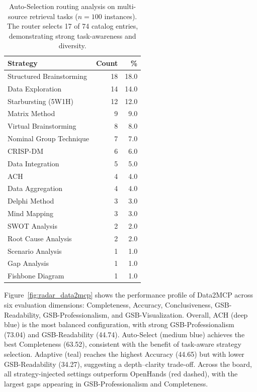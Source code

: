 \begin{table}[t]
  \caption{Auto-Selection routing analysis on multi-source retrieval tasks ($n=100$ instances). The router selects 17 of 74 catalog entries, demonstrating strong task-awareness and diversity.}
  \label{tab:routing_multisource}
  \centering
  \small
  \begin{tabular}{lrr}
    \toprule
    Strategy & Count & \% \\
    \midrule
    Structured Brainstorming & 18 & 18.0 \\
    Data Exploration & 14 & 14.0 \\
    Starbursting (5W1H) & 12 & 12.0 \\
    Matrix Method & 9 & 9.0 \\
    Virtual Brainstorming & 8 & 8.0 \\
    Nominal Group Technique & 7 & 7.0 \\
    CRISP-DM & 6 & 6.0 \\
    Data Integration & 5 & 5.0 \\
    ACH & 4 & 4.0 \\
    Data Aggregation & 4 & 4.0 \\
    Delphi Method & 3 & 3.0 \\
    Mind Mapping & 3 & 3.0 \\
    SWOT Analysis & 2 & 2.0 \\
    Root Cause Analysis & 2 & 2.0 \\
    Scenario Analysis & 1 & 1.0 \\
    Gap Analysis & 1 & 1.0 \\
    Fishbone Diagram & 1 & 1.0 \\
    \bottomrule
  \end{tabular}
\end{table}

Figure~\ref{fig:radar_data2mcp} shows the performance profile of Data2MCP across six evaluation dimensions: Completeness, Accuracy, Conclusiveness, GSB-Readability, GSB-Professionalism, and GSB-Visualization. Overall, ACH (deep blue) is the most balanced configuration, with strong GSB-Professionalism (73.04) and GSB-Readability (44.74). Auto-Select (medium blue) achieves the best Completeness (63.52), consistent with the benefit of task-aware strategy selection. Adaptive (teal) reaches the highest Accuracy (44.65) but with lower GSB-Readability (34.27), suggesting a depth--clarity trade-off. Across the board, all strategy-injected settings outperform OpenHands (red dashed), with the largest gaps appearing in GSB-Professionalism and Completeness.

